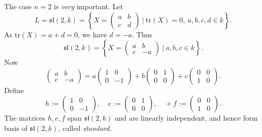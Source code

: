 The case $n = 2$ is \emph{very} important. Let
\[
	L = \mathfrak{sl}(2, k) = \left\{X =
	\begin{pmatrix}
		a & b \\
		c & d
	\end{pmatrix}
	\ |\ \text{tr}(X) = 0,\ a, b, c, d \in k
	\right\}.
\]
As $\text{tr}(X) = a + d = 0$, we have $d = -a$. Thus
\[
	\mathfrak{sl}(2, k) = \left\{X =
	\begin{pmatrix}
		a & b \\
		c & -a
	\end{pmatrix}
	\ |\ a, b, c \in k
	\right\}.
\]
Now
\[
	\begin{pmatrix}
		a & b \\
		c & -a
	\end{pmatrix}
	=
	a\begin{pmatrix}
		1 & 0 \\
		0 & -1
	\end{pmatrix}
	+
	b\begin{pmatrix}
		0 & 1 \\
		0 & 0
	\end{pmatrix}
	+
	c\begin{pmatrix}
		0 & 0 \\
		1 & 0
	\end{pmatrix}.
\]
Define
\[
	h :=
	\begin{pmatrix}
		1 & 0 \\
		0 & -1
	\end{pmatrix}, \quad
	e :=
	\begin{pmatrix}
		0 & 1 \\
		0 & 0
	\end{pmatrix}, \quad
	+
	f :=
	\begin{pmatrix}
		0 & 0 \\
		1 & 0
	\end{pmatrix}.
\]
The matrices $h, e, f$ span $\mathfrak{sl}(2, k)$ and are linearly independent, and hence form basis of $\mathfrak{sl}(2, k)$, called \emph{standard}.

